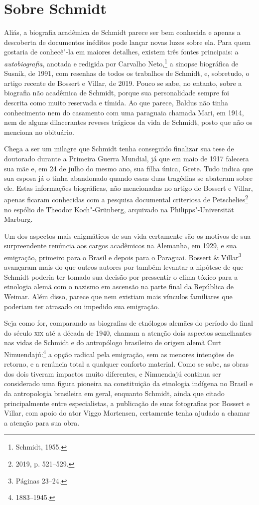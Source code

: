 \section{Sobre Schmidt}

Aliás, a biografia acadêmica de Schmidt parece ser bem %
conhecida e apenas a descoberta de documentos inéditos pode lançar novas luzes sobre
ela. Para quem gostaria de conhecê"-la em maiores detalhes, existem três
fontes principais: a \textit{autobiografia}, anotada e redigida por Carvalho
Neto,\footnote{Schmidt, 1955.} a sinopse biográfica de Susnik, de 1991, com
resenhas de todos os trabalhos de Schmidt, e, sobretudo, o artigo
recente de Bossert e Villar, de 2019. Pouco se sabe, no entanto, sobre a
biografia não acadêmica de Schmidt, porque sua personalidade sempre foi
descrita como muito reservada e tímida. Ao que parece, Baldus não tinha
conhecimento nem do casamento com uma paraguaia chamada Mari, em 1914,
nem de alguns dilacerantes reveses trágicos da vida de Schmidt, posto que
não os menciona no obituário.

Chega a ser um milagre que Schmidt tenha conseguido finalizar sua tese de
doutorado durante a Primeira Guerra Mundial, já que em maio de 1917
falecera sua mãe e, em 24 de julho do mesmo ano, sua filha única, Grete.
Tudo indica que sua esposa já o tinha abandonado quando essas duas
tragédias se abateram sobre ele. Estas informações biográficas, não
mencionadas no artigo de Bossert e Villar, apenas ficaram
conhecidas com a pesquisa documental criteriosa de Petschelies\footnote{2019, p.
521--529.} no espólio de Theodor Koch"-Grünberg, arquivado na
Philipps"-Universität Marburg.

Um dos aspectos mais enigmáticos de sua vida certamente são os motivos
de sua surpreendente renúncia aos cargos acadêmicos na Alemanha, em
1929, e sua emigração, primeiro para o Brasil e depois para o Paraguai.
Bossert \& Villar\footnote{Páginas 23--24.} avançaram mais do que outros autores
por também levantar a hipótese de que Schmidt poderia ter tomado sua
decisão por pressentir o clima tóxico para a etnologia alemã com o
nazismo em ascensão na parte final da República de Weimar. Além disso,
parece que nem existiam mais vínculos familiares que poderiam ter
atrasado ou impedido sua emigração.

Seja como for, comparando as biografias de etnólogos alemães do período
do final do século \textsc{xix} até a década de 1940, chamam a atenção dois
aspectos semelhantes nas vidas de Schmidt e do antropólogo brasileiro de
origem alemã Curt Nimuendajú:\footnote{1883--1945.} a opção radical pela
emigração, sem as menores intenções de retorno, e a renúncia total a
qualquer conforto material. Como se sabe, as obras dos dois tiveram
impactos muito diferentes, e Nimuendajú continua ser considerado uma
figura pioneira na constituição da etnologia indígena no Brasil e da
antropologia brasileira em geral, enquanto Schmidt, ainda que citado
principalmente entre especialistas, a publicação de suas
fotografias por Bossert e Villar, com apoio do ator Viggo
Mortensen, certamente tenha ajudado a chamar a atenção para sua obra.

